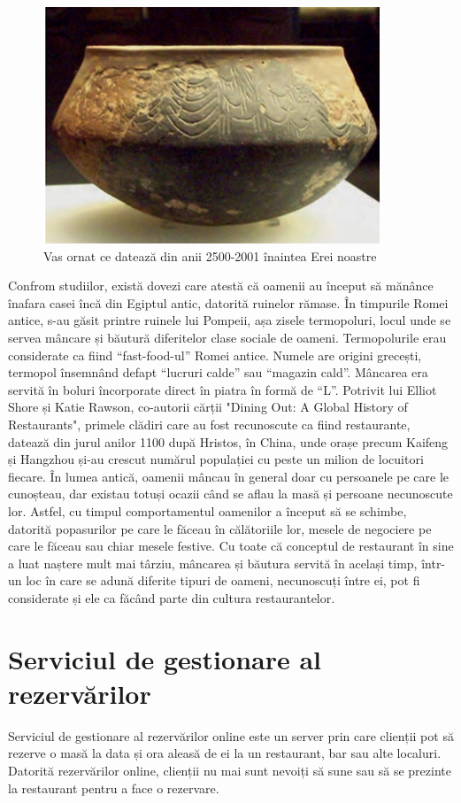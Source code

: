 \documentclass[a4paper,12pt]{book}
\begin{document}
\begin{figure}[htbp]
\centering
  \includegraphics[width=0.5\linewidth]{poza1.png}
  \caption{Vas ornat ce datează din anii 2500-2001 înaintea Erei noastre}
  \label{fig:vasOrnat}
\end{figure}
Confrom studiilor, există dovezi care atestă că oamenii au început să mănânce înafara casei încă din Egiptul antic, datorită ruinelor rămase. În timpurile Romei antice, s-au găsit printre ruinele lui Pompeii, așa zisele termopoluri, locul unde se servea mâncare și băutură diferitelor clase sociale de oameni. Termopolurile erau considerate ca fiind “fast-food-ul” Romei antice. Numele are origini grecești, termopol însemnând defapt “lucruri calde” sau “magazin cald”. Mâncarea era servită în boluri încorporate direct în piatra în formă de “L”. 
Potrivit lui Elliot Shore și Katie Rawson, co-autorii cărții "Dining Out: A Global History of Restaurants", primele clădiri care au fost recunoscute ca fiind restaurante,  datează din jurul anilor 1100 după Hristos, în China, unde orașe precum Kaifeng și Hangzhou și-au crescut numărul populației cu peste un milion de locuitori fiecare.\cite{History}
În lumea antică, oamenii mâncau în general doar cu persoanele pe care le cunoșteau, dar existau totuși ocazii când se aflau la masă și persoane necunoscute lor. Astfel,  cu timpul comportamentul oamenilor a început să se schimbe, datorită popasurilor pe care le făceau în călătoriile lor, mesele de negociere pe care le făceau sau chiar mesele festive. Cu toate că conceptul de restaurant în sine a luat naștere mult mai târziu, mâncarea și băutura servită în același timp, într-un loc în care se adună diferite tipuri de oameni, necunoscuți între ei, pot fi considerate și ele ca făcând parte din cultura restaurantelor. 

\section{Serviciul de gestionare al rezervărilor}\cite{Master}
Serviciul de gestionare al rezervărilor online este un server prin care clienții pot să 
rezerve o masă la data și ora aleasă de ei la un restaurant, bar sau alte localuri. Datorită 
rezervărilor online, clienții nu mai sunt nevoiți să sune sau să se prezinte la restaurant 
pentru a face o rezervare.
\end{document}
